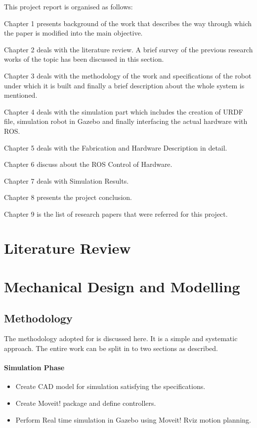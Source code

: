 \documentclass[a4paper,12pt,one side]{report}%
\begin{document}
This project report is organised as follows: 
\par 
Chapter 1 presents background of the work that describes the way through which the paper is modified into the main objective. 
\par
Chapter 2 deals with the literature review. A brief survey of the previous research works of the topic has been discussed in this section.
\par
Chapter 3 deals with the methodology of the work and specifications of the robot under which it is built and finally a brief description about the whole system is mentioned.
\par
Chapter 4 deals with the simulation part which includes the creation of URDF file, simulation robot in Gazebo and finally interfacing the actual hardware with ROS.
\par
Chapter 5 deals with the Fabrication and Hardware Description in detail.
\par
Chapter 6 discuss about the ROS Control of Hardware.
\par
Chapter 7 deals with Simulation Results.
\par
Chapter 8 presents the project conclusion.
\par
Chapter 9 is the list of research papers that were referred for this project.


\chapter{Literature Review}



\chapter{Mechanical Design and Modelling}
\section{Methodology}
The methodology adopted for is discussed here. It is a simple and systematic approach. The entire work can be split in to two sections as described.
\subsubsection{Simulation Phase}
\begin{itemize}
    \item Create CAD model for simulation satisfying the specifications.
    \item Create Moveit! package and define controllers.
    \item Perform Real time simulation in Gazebo using Moveit! Rviz motion planning.
\end{itemize}
\end{document}

